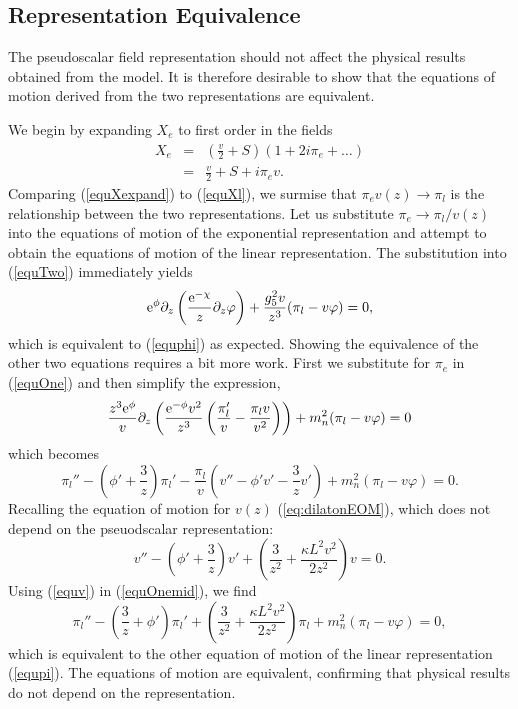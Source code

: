 \subsection{Representation Equivalence}

The pseudoscalar field representation should not affect the physical results obtained from the model. 
It is therefore desirable to show that the equations of motion derived from the two representations are equivalent.

We begin by expanding $X_{e}$ to first order in the fields 
\begin{eqnarray}
X_{e} & = & \left(\frac{v}{2}+S\right)(1+2i\pi_{e}+\ldots)\nonumber \\
 & = & \frac{v}{2}+S+i\pi_{e}v.\label{equXexpand}
\end{eqnarray}
Comparing (\ref{equXexpand}) to (\ref{equXl}), we surmise that $\pi_{e}v(z)\rightarrow\pi_{l}$ is the relationship between the two representations. 
Let us substitute
$\pi_{e}\rightarrow\pi_{l}/v(z)$ into the equations of motion of the exponential representation and attempt to obtain the equations of motion of the linear representation. 
The substitution into (\ref{equTwo}) immediately yields 
\begin{equation}
{\rm e}^{\phi}\partial_{z}\left(\frac{{\rm e}^{-\chi}}{z}\partial_{z}\varphi\right)+\frac{g_{5}^{2}v}{z^{3}}(\pi_{l}-v\varphi)=0,
\end{equation}
which is equivalent to (\ref{equphi}) as expected. 
Showing the equivalence of the other two equations requires a bit more work. 
First we substitute for $\pi_{e}$ in (\ref{equOne}) and then simplify the expression,
\begin{equation}
\frac{z^{3}{\rm e}^{\phi}}{v}\partial_{z}\left(\frac{{\rm e}^{-\phi}v^{2}}{z^{3}}\left(\frac{\pi_{l}'}{v}-\frac{\pi_{l}v}{v^{2}}\right)\right)+m_{n}^{2}(\pi_{l}-v\varphi)=0
\end{equation}
which becomes
\begin{equation}
\pi_{l}''-\left(\phi'+\frac{3}{z}\right)\pi_{l}'-\frac{\pi_{l}}{v}\left(v''-\phi'v'-\frac{3}{z}v'\right)+m_{n}^{2}(\pi_{l}-v\varphi)=0.\label{equOnemid}
\end{equation}
Recalling the equation of motion for $v(z)$ (\ref{eq:dilatonEOM}), which does not depend on the pseuodscalar representation: 
\begin{equation}
v''-\left(\phi'+\frac{3}{z}\right)v'+\left(\frac{3}{z^{2}}+\frac{\kappa L^{2}v^{2}}{2z^{2}}\right)v=0.\label{equv}
\end{equation}
Using (\ref{equv}) in (\ref{equOnemid}), we find 
\begin{equation}
\pi_{l}''-\left(\frac{3}{z}+\phi'\right)\pi_{l}'+\left(\frac{3}{z^{2}}+\frac{\kappa L^{2}v^{2}}{2z^{2}}\right)\pi_{l}+m_{n}^{2}\left(\pi_{l}-v\varphi\right)=0,
\end{equation}
which is equivalent to the other equation of motion of the linear representation (\ref{equpi}). 
The equations of motion are equivalent, confirming that physical results do not depend on the representation.

